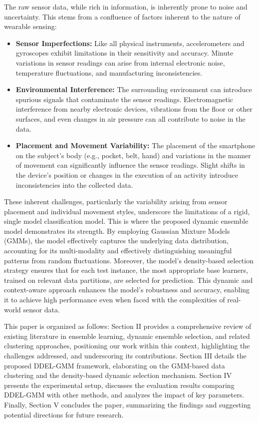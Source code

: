 \documentclass[lettersize,journal]{IEEEtran}
\newcommand{\greenhighlight}[1]{#1} %
\begin{document}
	
	The raw sensor data, while rich in information, is inherently prone to noise and uncertainty. This stems from a confluence of factors inherent to the nature of wearable sensing: 
	
	\begin{itemize}
		\item \textbf{Sensor Imperfections:} Like all physical instruments, accelerometers and gyroscopes exhibit limitations in their sensitivity and accuracy. Minute variations in sensor readings can arise from internal electronic noise, temperature fluctuations, and manufacturing inconsistencies. 
		\item \textbf{Environmental Interference:} The surrounding environment can introduce spurious signals that contaminate the sensor readings. Electromagnetic interference from nearby electronic devices, vibrations from the floor or other surfaces, and even changes in air pressure can all contribute to noise in the data. 
		\item \textbf{Placement and Movement Variability:} The placement of the smartphone on the subject's body (e.g., pocket, belt, hand) and variations in the manner of movement can significantly influence the sensor readings. Slight shifts in the device's position or changes in the execution of an activity introduce inconsistencies into the collected data. 
	\end{itemize}

	These inherent challenges, particularly the variability arising from sensor placement and individual movement styles, underscore the limitations of a rigid, single model classification model.
	 This is where the proposed dynamic ensemble model demonstrates its strength. By employing Gaussian Mixture Models (GMMs), the model effectively captures the underlying data distribution, accounting for its multi-modality and effectively distinguishing meaningful patterns from random fluctuations. Moreover, the model’s density-based selection strategy ensures that for each test instance, the most appropriate base learners, trained on relevant data partitions, are selected for prediction. This dynamic and context-aware approach enhances the model's robustness and accuracy, enabling it to achieve high performance even when faced with the complexities of real-world sensor data.
	
	\greenhighlight{
		This paper is organized as follows: 
		Section II provides a comprehensive review of existing literature in ensemble learning, dynamic ensemble selection, and related clustering approaches, positioning our work within this context, highlighting the challenges addressed, and underscoring its contributions. Section III details the proposed DDEL-GMM framework, elaborating on the GMM-based data clustering and the density-based dynamic selection mechanism. Section IV presents the experimental setup, discusses the evaluation results comparing DDEL-GMM with other methods, and analyzes the impact of key parameters. Finally, Section V concludes the paper, summarizing the findings and suggesting potential directions for future research.
	}
\end{document}
